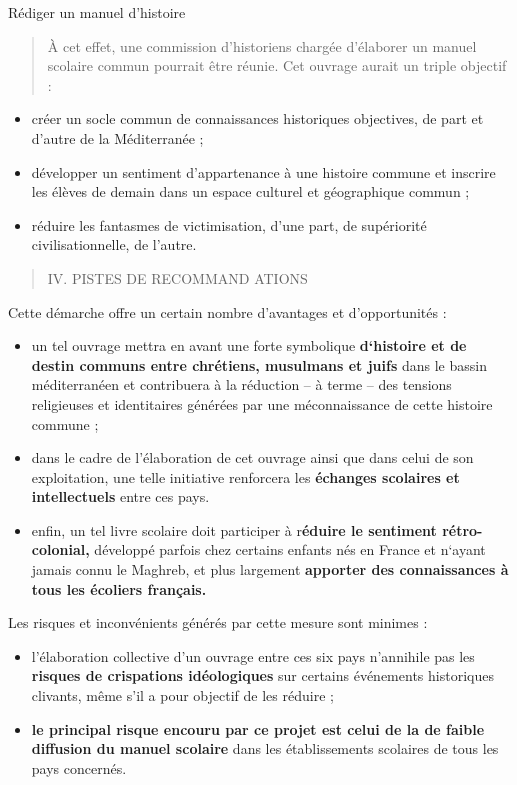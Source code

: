 Rédiger un manuel d'histoire

\begin{quote}
À cet effet, une commission d'historiens chargée d'élaborer un manuel
scolaire commun pourrait être réunie. Cet ouvrage aurait un triple
objectif :
\end{quote}

\begin{itemize}
\item
  créer un socle commun de connaissances historiques objectives, de part
  et d'autre de la Méditerranée ;
\item
  développer un sentiment d'appartenance à une histoire commune et
  inscrire les élèves de demain dans un espace culturel et géographique
  commun ;
\item
  réduire les fantasmes de victimisation, d'une part, de supériorité
  civilisationnelle, de l'autre.
\end{itemize}

\begin{quote}
IV. PISTES DE RECOMMAND ATIONS
\end{quote}

Cette démarche offre un certain nombre d'avantages et d'opportunités :

\begin{itemize}
\item
  un tel ouvrage mettra en avant une forte symbolique \textbf{d`histoire
  et de destin communs entre chrétiens, musulmans et juifs} dans le
  bassin méditerranéen et contribuera à la réduction -- à terme -- des
  tensions religieuses et identitaires générées par une méconnaissance
  de cette histoire commune ;
\item
  dans le cadre de l'élaboration de cet ouvrage ainsi que dans celui de
  son exploitation, une telle initiative renforcera les \textbf{échanges
  scolaires et intellectuels} entre ces pays.
\item
  enfin, un tel livre scolaire doit participer à r\textbf{éduire le
  sentiment rétro-colonial,} développé parfois chez certains enfants nés
  en France et n`ayant jamais connu le Maghreb, et plus largement
  \textbf{apporter des connaissances à tous les écoliers français.}
\end{itemize}

Les risques et inconvénients générés par cette mesure sont minimes :

\begin{itemize}
\item
  l'élaboration collective d'un ouvrage entre ces six pays n'annihile
  pas les \textbf{risques de crispations idéologiques} sur certains
  événements historiques clivants, même s'il a pour objectif de les
  réduire ;
\item
  \textbf{le principal risque encouru par ce projet est celui de la de
  faible diffusion du manuel scolaire} dans les établissements scolaires
  de tous les pays concernés.
\end{itemize}

